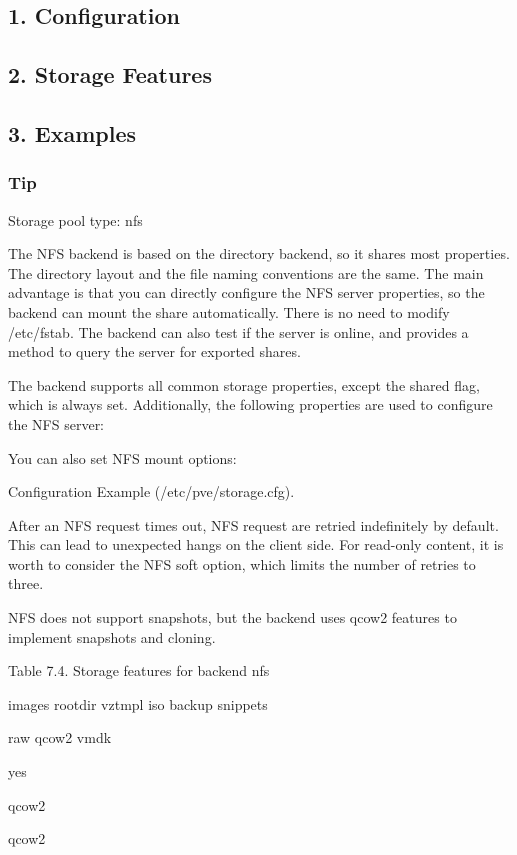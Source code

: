 \subsection{1. Configuration}

\subsection{2. Storage Features}

\subsection{3. Examples}

\subsubsection{Tip}

Storage pool type: nfs

The NFS backend is based on the directory backend, so it shares most properties. The directory layout and the file naming conventions are the same. The main advantage is that you can directly configure the NFS server properties, so the backend can mount the share automatically. There is no need to modify /etc/fstab. The backend can also test if the server is online, and provides a method to query the server for exported shares.

The backend supports all common storage properties, except the shared flag, which is always set. Additionally, the following properties are used to configure the NFS server:

You can also set NFS mount options:

Configuration Example (/etc/pve/storage.cfg).

After an NFS request times out, NFS request are retried indefinitely by default. This can lead to unexpected hangs on the client side. For read-only content, it is worth to consider the NFS soft option, which limits the number of retries to three.

NFS does not support snapshots, but the backend uses qcow2 features to implement snapshots and cloning.

Table 7.4. Storage features for backend nfs

images rootdir vztmpl iso backup snippets

raw qcow2 vmdk

yes

qcow2

qcow2

